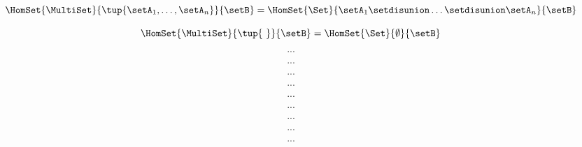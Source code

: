 \begin{forslides}
    \begin{equation}
        \label{eq:slides_multicategories_25}
       \HomSet{\MultiSet}{\tup{\setA_1,\ldots,\setA_n}}{\setB}=\HomSet{\Set}{\setA_1 \setdisunion \ldots \setdisunion \setA_n}{\setB}
    \end{equation}
    
     \begin{equation}
        \label{eq:slides_multicategories_26}
       \HomSet{\MultiSet}{\tup{ \ }}{\setB}=\HomSet{\Set}{ \emptyset }{\setB}
    \end{equation}
    
     \begin{equation}
        \label{eq:slides_multicategories_27}
      ...
    \end{equation}
    
     \begin{equation}
        \label{eq:slides_multicategories_28}
      ...
    \end{equation}
    
    \begin{equation}
        \label{eq:slides_multicategories_29}
       ...
    \end{equation}
    
     \begin{equation}
        \label{eq:slides_multicategories_30}
       ...
    \end{equation}
    
    \begin{equation}
        \label{eq:slides_multicategories_31}
       ...
    \end{equation}
    
     \begin{equation}
        \label{eq:slides_multicategories_32}
       ...
    \end{equation}
    
     \begin{equation}
        \label{eq:slides_multicategories_33}
      ...
    \end{equation}
    
     \begin{equation}
        \label{eq:slides_multicategories_34}
      ...
    \end{equation}
    
    \begin{equation}
        \label{eq:slides_multicategories_35}
       ...
    \end{equation}
    

\end{forslides}
